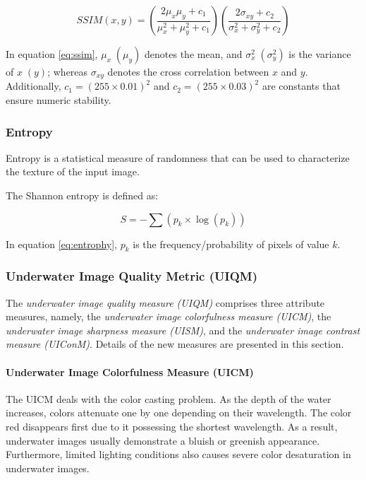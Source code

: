 \documentclass[a4paper]{article}
\begin{document}
\begin{equation}
    \label{eq:ssim}
    SSIM(x,y)=(\frac{2\mu_{x}\mu_{y} + c_{1}}{\mu_{x}^{2}+\mu_{y}^{2} + c_{1}})(\frac{2\sigma_{xy} + c_{2}}{\sigma_{x}^{2}+\sigma_{y}^{2} + c_{2}})
\end{equation}

In equation \ref{eq:ssim}, $\mu_x\;(\mu_y)$ denotes the mean, and $\sigma_x^2\;(\sigma_y^2)$ is the variance of $x\;(y)$; whereas $\sigma_{xy}$ denotes the cross correlation between $x$ and $y$. Additionally, $c_1 = (255 \times 0.01)^2$ and $c_2 = (255 \times 0.03)^2$ are constants that ensure numeric stability.

\subsubsection{Entropy}
Entropy is a statistical measure of randomness that can be used to characterize the texture of the input image.

The Shannon entropy is defined as:

\begin{equation}
    \label{eq:entrophy}
    S = -\sum(p_k \times \log(p_k))
\end{equation}

In equation \ref{eq:entrophy}, $p_k$ is the frequency/probability of pixels of value $k$.

\subsubsection{Underwater Image Quality Metric (UIQM)}
The \textit{underwater image quality measure (UIQM)} comprises three attribute measures, namely, the \textit{underwater image colorfulness measure (UICM)}, the \textit{underwater image sharpness measure (UISM)}, and the \textit{underwater image contrast measure (UIConM)}. Details of the new measures are presented in this section.

\paragraph{Underwater Image Colorfulness Measure (UICM)}
The UICM deals with the color casting problem. As the depth of the water increases, colors attenuate one by one depending on their wavelength. The color red disappears first due to it possessing the shortest wavelength. As a result, underwater images usually demonstrate a bluish or greenish appearance. Furthermore, limited lighting conditions also causes severe color desaturation in underwater images.
\end{document}
